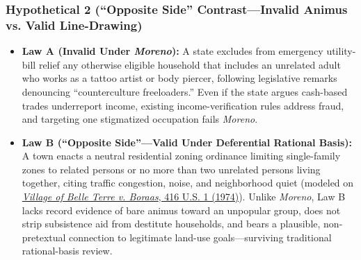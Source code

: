 \documentclass[12pt]{article}
\begin{document}
\subsubsection{Hypothetical 2 (``Opposite Side'' Contrast---Invalid Animus vs. Valid Line-Drawing)}
\begin{itemize}
  \item \textbf{Law A (Invalid Under \textit{Moreno}):} A state excludes from emergency utility-bill relief any otherwise eligible household that includes an unrelated adult who works as a tattoo artist or body piercer, following legislative remarks denouncing ``counterculture freeloaders.'' Even if the state argues cash-based trades underreport income, existing income-verification rules address fraud, and targeting one stigmatized occupation fails \textit{Moreno}.
  \item \textbf{Law B (``Opposite Side''---Valid Under Deferential Rational Basis):} A town enacts a neutral residential zoning ordinance limiting single-family zones to related persons or no more than two unrelated persons living together, citing traffic congestion, noise, and neighborhood quiet (modeled on \href{https://supreme.justia.com/cases/federal/us/416/1/}{\textit{Village of Belle Terre v. Boraas}, 416 U.S. 1 (1974)}). Unlike \textit{Moreno}, Law B lacks record evidence of bare animus toward an unpopular group, does not strip subsistence aid from destitute households, and bears a plausible, non-pretextual connection to legitimate land-use goals---surviving traditional rational-basis review.
\end{itemize}
\end{document}

